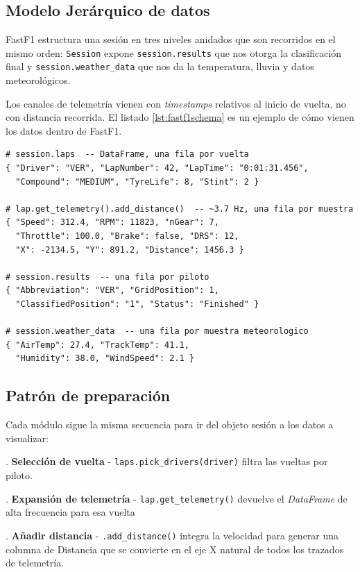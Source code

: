 \documentclass[12pt,a4paper,twoside,openright]{book}
\begin{document}
\subsection{Modelo Jerárquico de datos}
FastF1 estructura una sesión en tres niveles anidados que son recorridos en el mismo orden:
\texttt{Session} expone \texttt{session.results} que nos otorga la clasificación final y \texttt{session.weather\_data} que nos da la temperatura, lluvia y datos meteorológicos.

\noindent Los canales de telemetría vienen con \textit{timestamps} relativos al inicio de vuelta, no con distancia recorrida.
El listado \ref{lst:fastf1schema} es un ejemplo de cómo vienen los datos dentro de FastF1.
\begin{lstlisting}[caption={Campos representativos de cada nivel de datos de FastF1.},label=lst:fastf1schema,numbers=none]
# session.laps  -- DataFrame, una fila por vuelta
{ "Driver": "VER", "LapNumber": 42, "LapTime": "0:01:31.456",
  "Compound": "MEDIUM", "TyreLife": 8, "Stint": 2 }

# lap.get_telemetry().add_distance()  -- ~3.7 Hz, una fila por muestra
{ "Speed": 312.4, "RPM": 11823, "nGear": 7,
  "Throttle": 100.0, "Brake": false, "DRS": 12,
  "X": -2134.5, "Y": 891.2, "Distance": 1456.3 }

# session.results  -- una fila por piloto
{ "Abbreviation": "VER", "GridPosition": 1,
  "ClassifiedPosition": "1", "Status": "Finished" }

# session.weather_data  -- una fila por muestra meteorologico
{ "AirTemp": 27.4, "TrackTemp": 41.1,
  "Humidity": 38.0, "WindSpeed": 2.1 }
\end{lstlisting}

\subsection{Patrón de preparación}
Cada módulo sigue la misma secuencia para ir del objeto sesión a los datos a visualizar:

. \textbf{Selección de vuelta} - \texttt{laps.pick\_drivers(driver)} filtra las vueltas por piloto.

. \textbf{Expansión de telemetría} - \texttt{lap.get\_telemetry()} devuelve el \textit{DataFrame} de alta frecuencia para esa vuelta

. \textbf{Añadir distancia} - \texttt{.add\_distance()} integra la velocidad para generar una columna de Distancia que se convierte en el eje X natural de todos los trazados de telemetría.
\end{document}
